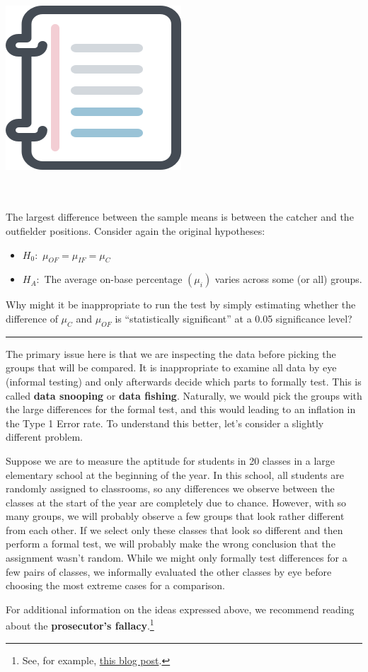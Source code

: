 \documentclass[
  10pt,
  openany]{book}
\providecommand{\tightlist}{%
  \setlength{\itemsep}{0pt}\setlength{\parskip}{0pt}}
\newenvironment{mdframedwithfootGPWE}
{   
    \savenotes
    \begin{mdframed}[%
    topline=true, bottomline=true, linecolor=oiB, linewidth=0.5pt,
    rightline=false, leftline=false,
    backgroundcolor=oiLGray]
    \renewcommand{\thempfootnote}{\arabic{footnote}}
    }
{
    \end{mdframed}
    \spewnotes
}
\newenvironment{workedexample}{
    \let\oldrule\rule
    \renewcommand{\rule}[2]{\vspace{-2mm}\oldrule{##1}{##2}\vspace{-2mm}}
\vspace{4mm}
\begin{mdframedwithfootGPWE}
\begin{minipage}[t]{0.10\textwidth}
{$\:$ \\ \setkeys{Gin}{width=2.5em,keepaspectratio}\includegraphics{images/_icons/worked-example.png}}
\end{minipage}
\hfill
\begin{minipage}[t]{0.90\textwidth}
\vspace{-2mm}
\setlength{\parskip}{1em}
\noindent\textbf{\color{oiB}\small\fontfamily{phv}\selectfont{\MakeUppercase{Example}}} $\:$ \\ \\
}{\end{minipage}
\end{mdframedwithfootGPWE}
\vspace{4mm}
}
\begin{document}
\begin{workedexample}
The largest difference between the sample means is between the catcher and the outfielder positions.
Consider again the original hypotheses:

\begin{itemize}
\tightlist
\item
  \(H_0:\) \(\mu_{OF} = \mu_{IF} = \mu_{C}\)
\item
  \(H_A:\) The average on-base percentage \((\mu_i)\) varies across some (or all) groups.
\end{itemize}

Why might it be inappropriate to run the test by simply estimating whether the difference of \(\mu_{C}\) and \(\mu_{OF}\) is ``statistically significant'' at a 0.05 significance level?

\begin{center}\rule{0.5\linewidth}{0.5pt}\end{center}

The primary issue here is that we are inspecting the data before picking the groups that will be compared.
It is inappropriate to examine all data by eye (informal testing) and only afterwards decide which parts to formally test.
This is called \textbf{data snooping} or \textbf{data fishing}.
Naturally, we would pick the groups with the large differences for the formal test, and this would leading to an inflation in the Type 1 Error rate.
To understand this better, let's consider a slightly different problem.

Suppose we are to measure the aptitude for students in 20 classes in a large elementary school at the beginning of the year.
In this school, all students are randomly assigned to classrooms, so any differences we observe between the classes at the start of the year are completely due to chance.
However, with so many groups, we will probably observe a few groups that look rather different from each other.
If we select only these classes that look so different and then perform a formal test, we will probably make the wrong conclusion that the assignment wasn't random.
While we might only formally test differences for a few pairs of classes, we informally evaluated the other classes by eye before choosing the most extreme cases for a comparison.

\end{workedexample}

For additional information on the ideas expressed above, we recommend reading about the \textbf{prosecutor's fallacy}.\footnote{See, for example, \href{https://statmodeling.stat.columbia.edu/2007/05/18/the_prosecutors/}{this blog post}.}
\end{document}
